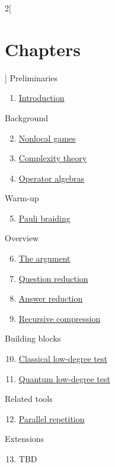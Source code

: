 \begin{multicols}{2}[\section{Chapters}]
\noindent
Preliminaries
\begin{enumerate}
\item \hyperref[introduction-section-phantom]{Introduction}
\end{enumerate}
Background
\begin{enumerate}
\setcounter{enumi}{1}
\item \hyperref[nonlocalgames-section-phantom]{Nonlocal games}
\item \hyperref[complexitytheory-section-phantom]{Complexity theory}
\item \hyperref[operatoralgebras-section-phantom]{Operator algebras}
\end{enumerate}
Warm-up
\begin{enumerate}
\setcounter{enumi}{4}
\item \hyperref[paulibraiding-section-phantom]{Pauli braiding}
\end{enumerate}
Overview
\begin{enumerate}
\setcounter{enumi}{5}
\item \hyperref[argument-section-phantom]{The argument}
\item \hyperref[questionreduction-section-phantom]{Question reduction}
\item \hyperref[answerreduction-section-phantom]{Answer reduction}
\item \hyperref[recursivecompression-section-phantom]{Recursive compression}
\end{enumerate}
Building blocks
\begin{enumerate}
\setcounter{enumi}{9}
\item \hyperref[classicalldt-section-phantom]{Classical low-degree test}
\item \hyperref[quantumldt-section-phantom]{Quantum low-degree test}
\end{enumerate}
Related tools
\begin{enumerate}
\setcounter{enumi}{11}
\item \hyperref[parallelrepetition-section-phantom]{Parallel repetition}
\end{enumerate}
Extensions
\begin{enumerate}
\setcounter{enumi}{12}
\item TBD
\end{enumerate}
\end{multicols}